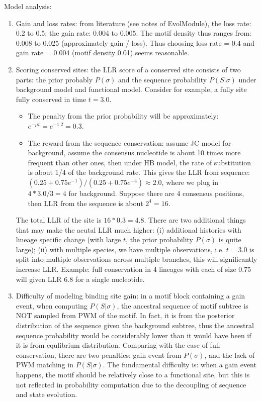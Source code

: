 \documentclass[11pt]{article}
\begin{document}
\begin{enumerate}
\begin{enumerate}
\end{enumerate}

Model analysis: 

\begin{enumerate}

\item Gain and loss rates: from literature (see notes of EvolModule), the loss rate: 0.2 to 0.5; the gain rate: 0.004 to 0.005. The motif density thus ranges from: 0.008 to 0.025 (approximately gain / loss). Thus choosing loss rate = 0.4 and gain rate = 0.004 (motif density 0.01) seems reasonable. 

\item Scoring conserved sites: the LLR score of a conserved site consists of two parts: the prior probably $P(\sigma)$ and the sequence probability $P(S|\sigma)$ under background model and functional model. Consider for example, a fully site fully conserved in time $t = 3.0$. 
\begin{itemize}
\item The penalty from the prior probability will be approximately: $e^{-\mu t} = e^{-1.2} = 0.3$. 
\item The reward from the sequence conservation: assume JC model for background, assume the consensus nucleotide is about 10 times more frequent than other ones, then under HB model, the rate of substitution is about 1/4 of the background rate. This gives the LLR from sequence: $(0.25 + 0.75 e^{-1}) / (0.25 + 0.75 e^{-4}) \approx 2.0$, where we plug in $4 * 3.0 / 3 = 4$ for background. Suppose there are 4 consensus positions, then LLR from the sequence is about $2^4 = 16$. 
\end{itemize}
The total LLR of the site is $16 * 0.3 = 4.8$. There are two additional things that may make the acutal LLR much higher: (i) additional histories with lineage specific change (with large $t$, the prior probability $P(\sigma)$ is quite large); (ii) with multiple species, we have multiple observations, i.e. $t = 3.0$ is split into multiple observations across multiple branches, this will significantly increase LLR. Example: full conservation in 4 lineages with each of size $0.75$ will given LLR $6.8$ for a single nucleotide. 

\item Difficulty of modeling binding site gain: in a motif block containing a gain event, when computing $P(S|\sigma)$, the ancestral sequence of motif subtree is NOT sampled from PWM of the motif. In fact, it is from the posterior distribution of the sequence given the background subtree, thus the ancestral sequence probability would be considerably lower than it would have been if it is from equlibrium distribution. Comparing with the case of full conservation, there are two penalties: gain event from $P(\sigma)$, and the lack of PWM matching in $P(S|\sigma)$. The fundamental difficulty is: when a gain event happens, the motif should be relatively close to a functional site, but this is not reflected in probability computation due to the decoupling of sequence and state evolution. 
\end{enumerate}


\end{enumerate}
\end{document}
